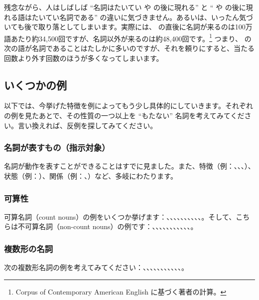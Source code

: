 残念ながら、人はしばしば \enquote{名詞はたいてい  や  の後に現れる} と \enquote{ や  の後に現れる語はたいてい名詞である} の違いに気づきません。あるいは、いったん気づいても後で取り落としてしまいます。実際には、 の直後に名詞が来るのは100万語あたり約34,500回ですが、名詞以外が来るのは約48,400回です。\footnote{Corpus of Contemporary American English \citep{COCA} に基づく著者の計算。} つまり、 の次の語が名詞であることはたしかに多いのですが、それを頼りにすると、当たる回数より外す回数のほうが多くなってしまいます。

\subsection{いくつかの例}\label{sec:examples}
以下では、今挙げた特徴を例によってもう少し具体的にしていきます。それぞれの例を見たあとで、その性質の一つ以上を \enquote{もたない} 名詞を考えてみてください。言い換えれば、反例を探してみてください。


\subsubsection*{名詞が表すもの（指示対象）}
名詞が動作を表すことができることはすでに見ました。また、特徴（例：、、、）、状態（例：）、関係（例：、）など、多岐にわたります。

\subsubsection*{可算性}

可算名詞（count nouns）の例をいくつか挙げます：、、、、、、、、、、。そして、こちらは不可算名詞（non-count nouns）の例です：、、、、、、、、、、、。

\subsubsection*{複数形の名詞}
次の複数形名詞の例を考えてみてください：、、、、、、、、、、、。

